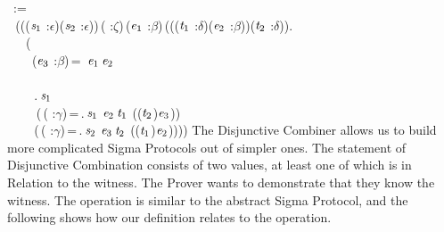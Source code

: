 \,\,\,:=\\
\,\,\,\,(\HOLTokenLambda{}((\ensuremath{\HOLBoundVar{s}\sb{\mathrm{1}}} :\ensuremath{\epsilon})\HOLSymConst{,}(\ensuremath{\HOLBoundVar{s}\sb{\mathrm{2}}} :\ensuremath{\epsilon}))\,( :\ensuremath{\zeta})\,(\ensuremath{\HOLBoundVar{e}\sb{\mathrm{1}}} :\ensuremath{\beta})\,(((\ensuremath{\HOLBoundVar{t}\sb{\mathrm{1}}} :\ensuremath{\delta})\HOLSymConst{,}(\ensuremath{\HOLBoundVar{e}\sb{\mathrm{2}}} :\ensuremath{\beta}))\HOLSymConst{,}(\ensuremath{\HOLBoundVar{t}\sb{\mathrm{2}}} :\ensuremath{\delta})).\\
\,\,\,\,\,\,\,\,\,(\\
\,\,\,\,\,\,\,\,\,\,\,\,(\ensuremath{\HOLBoundVar{e}\sb{\mathrm{3}}} :\ensuremath{\beta})\,=\,\,\,\ensuremath{\HOLBoundVar{e}\sb{\mathrm{1}}}\,\ensuremath{\HOLBoundVar{e}\sb{\mathrm{2}}}\\
\,\,\,\,\,\,\,\,\,\,\\
\,\,\,\,\,\,\,\,\,\,\,\,\,.\,\ensuremath{\HOLBoundVar{s}\sb{\mathrm{1}}}\,\,\\
\,\,\,\,\,\,\,\,\,\,\,\,\,\,(\,( :\ensuremath{\gamma})\,=\,.\,\ensuremath{\HOLBoundVar{s}\sb{\mathrm{1}}}\,\,\ensuremath{\HOLBoundVar{e}\sb{\mathrm{2}}}\,\ensuremath{\HOLBoundVar{t}\sb{\mathrm{1}}}\,\,((\HOLSymConst{,}\ensuremath{\HOLBoundVar{t}\sb{\mathrm{2}}})\HOLSymConst{,}\ensuremath{\HOLBoundVar{e}\sb{\mathrm{3}}}))\\
\,\,\,\,\,\,\,\,\,\,\,\,\,(\,( :\ensuremath{\gamma})\,=\,.\,\ensuremath{\HOLBoundVar{s}\sb{\mathrm{2}}}\,\,\ensuremath{\HOLBoundVar{e}\sb{\mathrm{3}}}\,\ensuremath{\HOLBoundVar{t}\sb{\mathrm{2}}}\,\,((\HOLSymConst{,}\ensuremath{\HOLBoundVar{t}\sb{\mathrm{1}}})\HOLSymConst{,}\ensuremath{\HOLBoundVar{e}\sb{\mathrm{2}}}))))\HOLTokenRightrec{}
The Disjunctive Combiner allows us to build more complicated Sigma Protocols out of simpler
ones. The statement of Disjunctive Combination consists of two values, at least one of which is in Relation to the witness. 
The Prover wants to demonstrate that they know the witness. The operation is similar to the
abstract Sigma Protocol, and the following shows how our definition relates to the operation.
